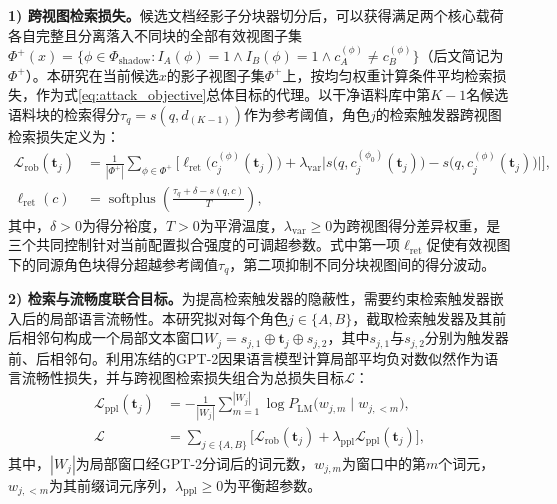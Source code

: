 \textbf{1) 跨视图检索损失。}候选文档经影子分块器切分后，可以获得满足两个核心载荷各自完整且分离落入不同块的全部有效视图子集$\Phi^+(x)=\{\phi\in\Phi_{\mathrm{shadow}}:I_A(\phi)=1\land I_B(\phi)=1\land c_A^{(\phi)}\neq c_B^{(\phi)}\}$（后文简记为$\Phi^+$）。本研究在当前候选$x$的影子视图子集$\Phi^+$上，按均匀权重计算条件平均检索损失，作为式\eqref{eq:attack_objective}总体目标的代理。以干净语料库中第$K-1$名候选语料块的检索得分$\tau_q=s(q,d_{(K-1)})$作为参考阈值，角色$j$的检索触发器跨视图检索损失定义为：
\begin{equation}
\begin{aligned}
  \mathcal L_{\mathrm{rob}}(\mathbf t_j)&=
  \frac{1}{|\Phi^+|}\sum_{\phi\in\Phi^+}\Big[
  \ell_{\mathrm{ret}}\big(c_j^{(\phi)}(\mathbf t_j)\big)
  +\lambda_{\mathrm{var}}\big|s\big(q,c_j^{(\phi_0)}(\mathbf t_j)\big)-s\big(q,c_j^{(\phi)}(\mathbf t_j)\big)\big|\Big],\\
  \ell_{\mathrm{ret}}(c)&=\operatorname{softplus}\!\left(\frac{\tau_q+\delta-s(q,c)}{T}\right),
\end{aligned}
  \label{eq:chunk_rob_loss}
\end{equation}
其中，$\delta>0$为得分裕度，$T>0$为平滑温度，$\lambda_{\mathrm{var}}\ge 0$为跨视图得分差异权重，是三个共同控制针对当前配置拟合强度的可调超参数。式中第一项$\ell_{\mathrm{ret}}$促使有效视图下的同源角色块得分超越参考阈值$\tau_q$，第二项抑制不同分块视图间的得分波动。

\textbf{2) 检索与流畅度联合目标。}为提高检索触发器的隐蔽性，需要约束检索触发器嵌入后的局部语言流畅性。本研究拟对每个角色$j\in\{A,B\}$，截取检索触发器及其前后相邻句构成一个局部文本窗口$W_j=s_{j,1}\oplus\mathbf t_j\oplus s_{j,2}$，其中$s_{j,1}$与$s_{j,2}$分别为触发器前、后相邻句。利用冻结的GPT-2\cite{radford2019language}因果语言模型计算局部平均负对数似然作为语言流畅性损失，并与跨视图检索损失组合为总损失目标$\mathcal L$：
\begin{equation}
\begin{aligned}
  \mathcal L_{\mathrm{ppl}}(\mathbf t_j)&=-\frac{1}{|W_j|}\sum_{m=1}^{|W_j|} \log P_{\mathrm{LM}}\big(w_{j,m}\mid w_{j,<m}\big),\\
  \mathcal L&=\sum_{j\in\{A,B\}}\big[\mathcal L_{\mathrm{rob}}(\mathbf t_j)+\lambda_{\mathrm{ppl}}\mathcal L_{\mathrm{ppl}}(\mathbf t_j)\big],
\end{aligned}
  \label{eq:local_ppl}
\end{equation}
其中，$|W_j|$为局部窗口经GPT-2分词后的词元数，$w_{j,m}$为窗口中的第$m$个词元，$w_{j,<m}$为其前缀词元序列，$\lambda_{\mathrm{ppl}}\ge 0$为平衡超参数。

